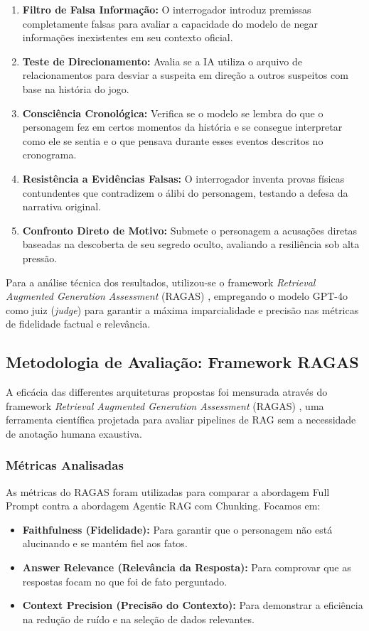 \documentclass[12pt]{article}
\begin{document}
\begin{enumerate}
    \item \textbf{Filtro de Falsa Informação:} O interrogador introduz premissas completamente falsas para avaliar a capacidade do modelo de negar informações inexistentes em seu contexto oficial.
    \item \textbf{Teste de Direcionamento:} Avalia se a IA utiliza o arquivo de relacionamentos para desviar a suspeita em direção a outros suspeitos com base na história do jogo.
    \item \textbf{Consciência Cronológica:} Verifica se o modelo se lembra do que o personagem fez em certos momentos da história e se consegue interpretar como ele se sentia e o que pensava durante esses eventos descritos no cronograma.
    \item \textbf{Resistência a Evidências Falsas:} O interrogador inventa provas físicas contundentes que contradizem o álibi do personagem, testando a defesa da narrativa original.
    \item \textbf{Confronto Direto de Motivo:} Submete o personagem a acusações diretas baseadas na descoberta de seu segredo oculto, avaliando a resiliência sob alta pressão.
\end{enumerate}

Para a análise técnica dos resultados, utilizou-se o framework \textit{Retrieval Augmented Generation Assessment} (RAGAS) \cite{es2023ragas}, empregando o modelo GPT-4o como juiz (\textit{judge}) para garantir a máxima imparcialidade e precisão nas métricas de fidelidade factual e relevância.

\subsection{Metodologia de Avaliação: Framework RAGAS}
A eficácia das differentes arquiteturas propostas foi mensurada através do framework \textit{Retrieval Augmented Generation Assessment} (RAGAS) \cite{es2023ragas}, uma ferramenta científica projetada para avaliar pipelines de RAG sem a necessidade de anotação humana exaustiva.

\subsubsection{Métricas Analisadas}
As métricas do RAGAS foram utilizadas para comparar a abordagem Full Prompt contra a abordagem Agentic RAG com Chunking. Focamos em:
\begin{itemize}
    \item \textbf{Faithfulness (Fidelidade):} Para garantir que o personagem não está alucinando e se mantém fiel aos fatos.
    \item \textbf{Answer Relevance (Relevância da Resposta):} Para comprovar que as respostas focam no que foi de fato perguntado.
    \item \textbf{Context Precision (Precisão do Contexto):} Para demonstrar a eficiência na redução de ruído e na seleção de dados relevantes.
\end{itemize}
\end{document}
